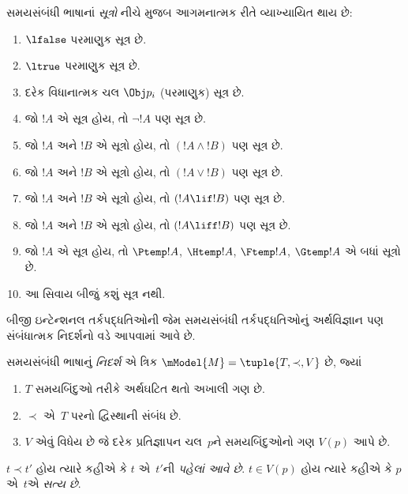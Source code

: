 \begin{defn}
સમયસંબંધી ભાષાનાં \emph{સૂત્રો} નીચે મુજબ આગમનાત્મક રીતે
  વ્યાખ્યાયિત થાય છે:
\begin{enumerate}
\item $\lfalse$ પરમાણુક સૂત્ર છે.

\item $\ltrue$ પરમાણુક સૂત્ર છે.

\item દરેક વિધાનાત્મક ચલ $\Obj p_i$ (પરમાણુક) સૂત્ર છે.

\item જો $!A$ એ સૂત્ર હોય, તો $\lnot !A$ પણ
  સૂત્ર છે.

\item જો $!A$ અને $!B$ એ સૂત્રો હોય, તો $(!A \land
  !B)$ પણ સૂત્ર છે.

\item જો $!A$ અને $!B$ એ સૂત્રો હોય, તો $(!A \lor !B)$
  પણ સૂત્ર છે.

\item જો $!A$ અને $!B$ એ સૂત્રો હોય, તો $(!A \lif !B)$
  પણ સૂત્ર છે.

\item જો $!A$ અને $!B$ એ સૂત્રો હોય, તો $(!A \liff !B)$
  પણ સૂત્ર છે.

\item જો $!A$ એ સૂત્ર હોય, તો $\Ptemp  !A$, $\Htemp  !A$, $\Ftemp !A$, $\Gtemp  !A$
  એ બધાં સૂત્રો છે.

\item આ સિવાય બીજું કશું સૂત્ર નથી.
\end{enumerate}
\end{defn}

બીજી ઇન્ટેન્શનલ તર્કપદ્ધતિઓની જેમ સમયસંબંધી તર્કપદ્ધતિઓનું
અર્થવિજ્ઞાન પણ સંબંધાત્મક નિદર્શનો વડે આપવામાં આવે છે.

\begin{defn}
  સમયસંબંધી ભાષાનું \emph{નિદર્શ} એ ત્રિક
  $\mModel{M} = \tuple{T, \prec, V}$ છે, જ્યાં
  \begin{enumerate}
  \item $T$ સમયબિંદુઓ તરીકે અર્થઘટિત થતો અખાલી ગણ છે.
  \item $\prec$ એ~$T$ પરનો દ્વિસ્થાની સંબંધ છે.
  \item $V$ એવું વિધેય છે જે દરેક પ્રતિજ્ઞાપન ચલ~$p$ને સમયબિંદુઓનો ગણ $V(p)$ આપે છે.
  \end{enumerate}
  $t \prec t'$ હોય ત્યારે કહીએ કે $t$ એ~$t'$ની \emph{પહેલાં આવે છે}.
  $t \in V(p)$ હોય ત્યારે કહીએ કે $p$ એ~$t$એ \emph{સત્ય છે}.
\end{defn}

